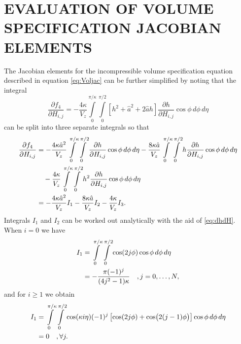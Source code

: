 
\chapter[EVALUATION OF VOLUME SPECIFICATION JACOBIAN\\ ELEMENTS]{EVALUATION OF VOLUME SPECIFICATION JACOBIAN ELEMENTS} \label{App:1}
The Jacobian elements for the incompressible volume specification equation described in equation \eqref{eq:Voljac} can be further simplified by noting that the integral
\begin{equation}
\frac{\partial f_4}{\partial H_{i,j}} = -\frac{4\kappa}{V_z} \int\limits_0^{\pi/\kappa} \int\limits_0^{\pi/2} \left[ h^2 +\hat{a}^2+2\hat{a}h  \right]\frac{\partial h}{\partial H_{i,j}}\cos\phi \,d\phi\, d\eta \label{eq:Voljac1}
\end{equation}
can be split into three separate integrals so that
\begin{align}
\frac{\partial f_4}{\partial H_{i,j}} &=  -\frac{4\kappa\hat{a}^2}{V_z} \int\limits_0^{\pi/\kappa} \int\limits_0^{\pi/2} \frac{\partial h}{\partial H_{i,j}}\cos\phi\,d\phi\,d\eta -\frac{8\kappa\hat{a}}{V_z} \int\limits_0^{\pi/\kappa} \int\limits_0^{\pi/2} h \frac{\partial h}{\partial H_{i,j}}\cos\phi\,d\phi\,d\eta \notag \\
& \quad -\frac{4\kappa}{V_z} \int\limits_0^{\pi/\kappa} \int\limits_0^{\pi/2} h^2 \frac{\partial h}{\partial H_{i,j}}\cos\phi\,d\phi\,d\eta \notag \\
&=-\frac{4\kappa\hat{a}^2}{V_z} I_1 -\frac{8\kappa\hat{a}}{V_z} I_2 -\frac{4\kappa}{V_z} I_3. \label{eq:Volintsplit}
\end{align}
Integrals $I_1$ and $I_2$ can be worked out analytically with the aid of \eqref{eq:dhdH}. When $i=0$ we have
\begin{align}
I_1&=\int\limits_0^{\pi/\kappa} \int\limits_0^{\pi/2} \cos(2j\phi)\cos\phi\,d\phi\,d\eta \notag \\
&=-\frac{\pi (-1)^j}{(4j^2-1)\kappa} \quad,j=0,\ldots,N,
\end{align}
and for $i\ge1$ we obtain
\begin{align}
I_1&=\int\limits_0^{\pi/\kappa} \int\limits_0^{\pi/2} \cos(\kappa i \eta)(-1)^j\left[\cos(2j\phi)+\cos \bigl(2(j-1)\phi \bigr) \right]\cos\phi\,d\phi\,d\eta \notag \\
&=0 \quad, \forall j.
\end{align}

